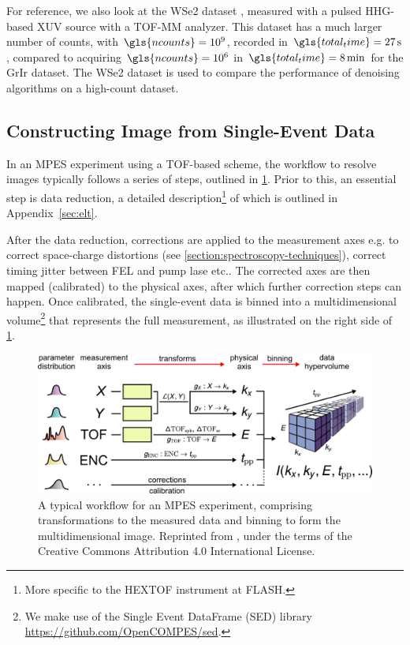 For reference, we also look at the \gls{WSe2} dataset \cite{maklarTimeresolvedARPESRAW2022}, measured with a pulsed \gls{HHG}-based \gls{XUV} source with a \gls{TOF}-\gls{MM} analyzer. This dataset has a much larger number of counts, with $\gls{ncounts}=\num{e9}$, recorded in $\gls{total_time}=\qty{27}{s}$, compared to acquiring $\gls{ncounts}=\num{e6}$ in $\gls{total_time}=\qty{8}{\min}$ for the \gls{GrIr} dataset. The \gls{WSe2} dataset is used to compare the performance of denoising algorithms on a high-count dataset.

\subsection*{Constructing Image from Single-Event Data}
In an \gls{MPES} experiment using a \gls{TOF}-based scheme, the workflow to resolve images typically follows a series of steps, outlined in \cref{fig:mpes_workflow}. Prior to this, an essential step is data reduction, a detailed description\footnote{More specific to the \gls{HEXTOF} instrument at \gls{FLASH}.} of which is outlined in Appendix~\ref{sec:elt}.

After the data reduction, corrections are applied to the measurement axes e.g. to correct space-charge distortions (see \cref{section:spectroscopy-techniques}), correct timing jitter between \gls{FEL} and pump lase etc.. The corrected axes are then mapped (calibrated) to the physical axes, after which further correction steps can happen. Once calibrated, the single-event data is binned into a multidimensional volume\footnote{We make use of the Single Event DataFrame (SED) library \href{https://github.com/OpenCOMPES/sed}{https://github.com/OpenCOMPES/sed}.} that represents the full measurement, as illustrated on the right side of \cref{fig:mpes_workflow}.

\begin{figure}[h]
    \centering
    \includegraphics[width=1\linewidth]{images/41597_2020_769_Fig2_HTML.png}
    \caption{A typical workflow for an \gls{MPES} experiment, comprising transformations to the measured data and binning to form the multidimensional image. Reprinted from \cite{xianOpensourceEndtoendWorkflow2020}, under the terms of the Creative Commons Attribution 4.0 International License.}
    \label{fig:mpes_workflow}
\end{figure}


